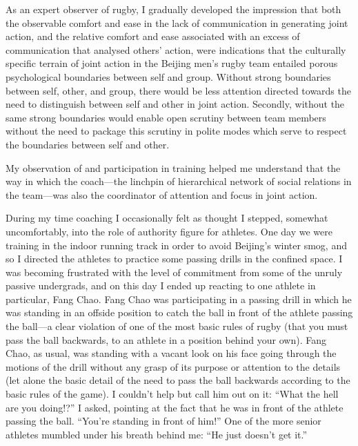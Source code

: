 \begin{CJK}{UTF8}{gbsn}
As an expert observer of rugby, I gradually developed the impression that both the observable comfort and ease in the lack of communication in generating joint action, and the relative comfort and ease associated with an excess of communication that analysed others' action, were indications that the culturally specific terrain of joint action in the Beijing men's rugby team entailed porous psychological boundaries between self and group.  Without strong boundaries between self, other, and group, there would be less attention directed towards the need to distinguish between self and other in joint action.  Secondly, without the same strong boundaries would enable open scrutiny between team members without the need to package this scrutiny in polite modes which serve to respect the boundaries between self and other.



My observation of and participation in training helped me understand that the way in which the coach---the linchpin of hierarchical network of social relations in the team---was also the coordinator of attention and focus in joint action.

During my time coaching I occasionally felt as thought I stepped, somewhat uncomfortably, into the role of authority figure for athletes.  One day we were training in the indoor running track in order to avoid Beijing's winter smog, and so I directed the athletes to practice some passing drills in the confined space.  I was becoming frustrated with the level of commitment from some of the unruly passive undergrads, and on this day I ended up reacting to one athlete in particular, Fang Chao.  Fang Chao was participating in a passing drill in which he was standing in an offside position to catch the ball in front of the athlete passing the ball---a clear violation of one of the most basic rules of rugby (that you must pass the ball backwards, to an athlete in a position behind your own).  Fang Chao, as usual, was standing with a vacant look on his face going through the motions of the drill without any grasp of its purpose or attention to the details (let alone the basic detail of the need to pass the ball backwards according to the basic rules of the game).  I couldn't help but call him out on it: ``What the hell are you doing!?'' I asked, pointing at the fact that he was in front of the athlete passing the ball.  ``You're standing in front of him!'' One of the more senior athletes mumbled under his breath behind me: ``He just doesn't get it.''


\end{CJK}
